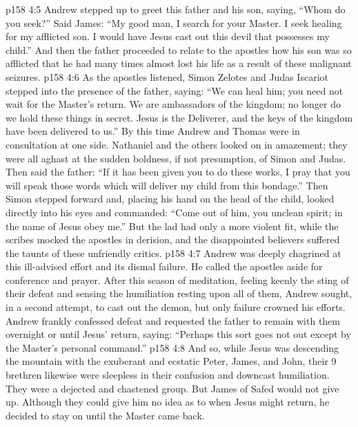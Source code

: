 \vs p158 4:5 Andrew stepped up to greet this father and his son, saying, “Whom do you seek?” Said James: “My good man, I search for your Master. I seek healing for my afflicted son. I would have Jesus cast out this devil that possesses my child.” And then the father proceeded to relate to the apostles how his son was so afflicted that he had many times almost lost his life as a result of these malignant seizures.
\vs p158 4:6 As the apostles listened, Simon Zelotes and Judas Iscariot stepped into the presence of the father, saying: “We can heal him; you need not wait for the Master’s return. We are ambassadors of the kingdom; no longer do we hold these things in secret. Jesus is the Deliverer, and the keys of the kingdom have been delivered to us.” By this time Andrew and Thomas were in consultation at one side. Nathaniel and the others looked on in amazement; they were all aghast at the sudden boldness, if not presumption, of Simon and Judas. Then said the father: “If it has been given you to do these works, I pray that you will speak those words which will deliver my child from this bondage.” Then Simon stepped forward and, placing his hand on the head of the child, looked directly into his eyes and commanded: “Come out of him, you unclean spirit; in the name of Jesus obey me.” But the lad had only a more violent fit, while the scribes mocked the apostles in derision, and the disappointed believers suffered the taunts of these unfriendly critics.
\vs p158 4:7 Andrew was deeply chagrined at this ill\hyp{}advised effort and its dismal failure. He called the apostles aside for conference and prayer. After this season of meditation, feeling keenly the sting of their defeat and sensing the humiliation resting upon all of them, Andrew sought, in a second attempt, to cast out the demon, but only failure crowned his efforts. Andrew frankly confessed defeat and requested the father to remain with them overnight or until Jesus’ return, saying: “Perhaps this sort goes not out except by the Master’s personal command.”
\vs p158 4:8 And so, while Jesus was descending the mountain with the exuberant and ecstatic Peter, James, and John, their 9 brethren likewise were sleepless in their confusion and downcast humiliation. They were a dejected and chastened group. But James of Safed would not give up. Although they could give him no idea as to when Jesus might return, he decided to stay on until the Master came back.
